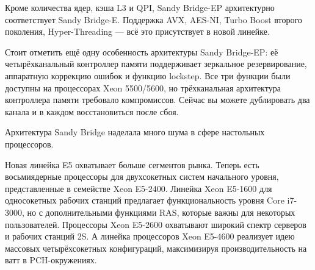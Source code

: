 \documentclass[a4paper,12pt,notitlepage,headsepline,pdftex]{scrartcl}
\begin{document}
  Кроме количества ядер, кэша L3 и QPI, Sandy Bridge-EP архитектурно
  соответствует Sandy Bridge-E.
  Поддержка AVX, AES-NI, Turbo Boost второго поколения, Hyper-Threading ---
  всё это присутствует в новой линейке.

  Стоит отметить ещё одну особенность архитектуры Sandy Bridge-EP: её
  четырёхканальный контроллер памяти поддерживает зеркальное резервирование,
  аппаратную коррекцию ошибок и функцию lockstep.
  Все три функции были доступны на процессорах Xeon 5500/5600, но
  трёхканальная архитектура контроллера памяти требовало компромиссов.
  Сейчас вы можете дублировать два канала и в каждом восстановиться после
  сбоя.



  Архитектура Sandy Bridge наделала много шума в сфере настольных процессоров.

  Новая линейка E5 охватывает больше сегментов рынка.
  Теперь есть восьмиядерные процессоры для двухсокетных систем начального
  уровня, представленные в семействе Xeon E5-2400.
  Линейка Xeon E5-1600 для односокетных рабочих станций предлагает
  функциональность уровня Core i7-3000, но с дополнительными функциями RAS,
  которые важны для некоторых пользователей.
  Процессоры Xeon E5-2600 охватывают широкий спектр серверов и рабочих станций
  2S.
  А линейка процессоров Xeon E5-4600 реализует идею массовых четырёхсокетных
  конфигураций, максимизируя производительность на ватт в PCH-окружениях.
\end{document}
